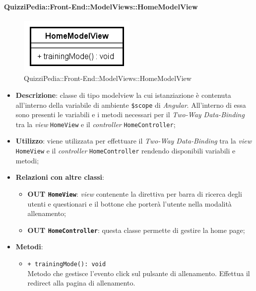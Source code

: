 \paragraph{QuizziPedia::Front-End::ModelViews::HomeModelView}
	
	\label{QuizziPedia::Front-End::ModelViews::HomeModelView}
	
	\begin{figure}[ht]
		\centering
		\includegraphics[scale=0.80,keepaspectratio]{UML/Classi/Front-End/QuizziPedia_Front-end_ModelView_HomeModelView.png}
		\caption{QuizziPedia::Front-End::ModelViews::HomeModelView}
	\end{figure} \FloatBarrier
	
	\begin{itemize}
		\item \textbf{Descrizione}: classe di tipo modelview la cui istanziazione è contenuta all'interno della variabile di ambiente \texttt{\$scope} di \textit{Angular}. All'interno di essa sono presenti le variabili e i metodi necessari per il \textit{Two-Way Data-Binding} tra la \textit{view} \texttt{HomeView} e il \textit{controller} \texttt{HomeController};
		\item \textbf{Utilizzo}: viene utilizzata per effettuare il \textit{Two-Way Data-Binding} tra la \textit{view} \texttt{HomeView} e il \textit{controller} \texttt{HomeController} rendendo disponibili variabili e metodi;
		\item \textbf{Relazioni con altre classi}: 
		\begin{itemize}
			\item \textbf{OUT \texttt{HomeView}}: \textit{view} contenente la direttiva per barra di ricerca degli utenti e questionari e il bottone che porterà l'utente nella modalità allenamento; 
			\item \textbf{OUT \texttt{HomeController}}: questa classe permette di gestire la home page;
		\end{itemize}
		\item \textbf{Metodi}: 
		\begin{itemize}
			\item \texttt{+ trainingMode(): void} \\
			Metodo che gestisce l’evento click sul pulsante di allenamento. Effettua il redirect alla pagina di allenamento.
		\end{itemize}
	\end{itemize}
	
	